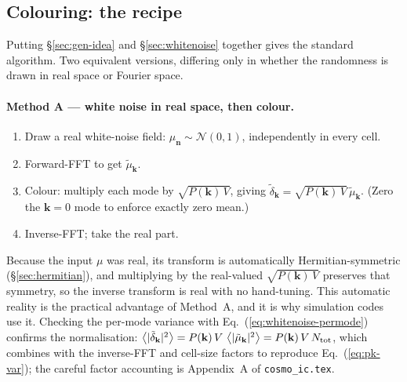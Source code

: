 \documentclass[12pt]{article}
\newcommand{\bk}{\mathbf{k}}
\newcommand{\bn}{\mathbf{n}}
\newcommand{\avg}[1]{\left\langle #1 \right\rangle}
\newcommand{\code}[1]{\texttt{#1}}
\begin{document}
\subsection{Colouring: the recipe}
\label{sec:colouring}

Putting \S\ref{sec:gen-idea} and \S\ref{sec:whitenoise} together gives
the standard algorithm.  Two equivalent versions, differing only in
whether the randomness is drawn in real space or Fourier space.

\paragraph{Method A --- white noise in real space, then colour.}
\begin{enumerate}
  \item Draw a real white-noise field: $\mu_\bn \sim \mathcal N(0,1)$,
        independently in every cell.
  \item Forward-FFT to get $\tilde\mu_\bk$.
  \item Colour: multiply each mode by $\sqrt{P(\bk)\,V}$, giving
        $\tilde\delta_\bk = \sqrt{P(\bk)\,V}\,\tilde\mu_\bk$.  (Zero the
        $\bk = 0$ mode to enforce exactly zero mean.)
  \item Inverse-FFT; take the real part.
\end{enumerate}
Because the input $\mu$ was real, its transform is automatically
Hermitian-symmetric (\S\ref{sec:hermitian}), and multiplying by the
real-valued $\sqrt{P(\bk)\,V}$ preserves that symmetry, so the inverse
transform is real with no hand-tuning.  This automatic reality is the
practical advantage of Method~A, and it is why simulation codes use it.
Checking the per-mode variance with
Eq.~(\ref{eq:whitenoise-permode}) confirms the normalisation:
$\avg{|\tilde\delta_\bk|^2} = P(\bk)\,V\,\avg{|\tilde\mu_\bk|^2}
= P(\bk)\,V\,N_{\rm tot}$, which combines with the inverse-FFT and
cell-size factors to reproduce Eq.~(\ref{eq:pk-var}); the careful factor
accounting is Appendix~A of \code{cosmo\_ic.tex}.
\end{document}
